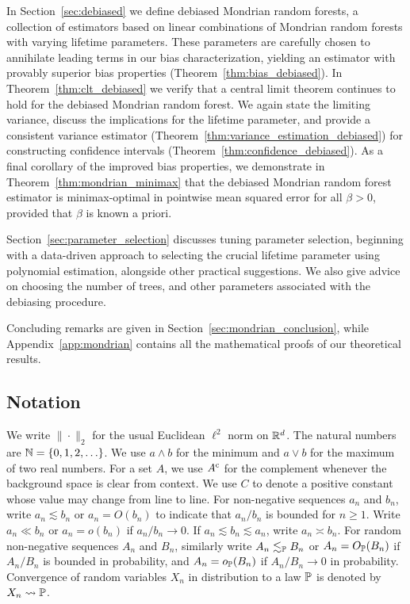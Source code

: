 In Section~\ref{sec:debiased} we define debiased Mondrian random forests,
a collection of estimators
based on linear combinations of Mondrian random forests
with varying lifetime parameters.
These parameters are carefully chosen to annihilate leading terms
in our bias characterization,
yielding an estimator with provably superior bias properties
(Theorem~\ref{thm:bias_debiased}).
In Theorem~\ref{thm:clt_debiased} we verify that a central limit theorem
continues to hold for the debiased Mondrian random forest.
We again state the limiting variance,
discuss the implications for the lifetime parameter, and provide
a consistent variance estimator
(Theorem~\ref{thm:variance_estimation_debiased})
for constructing confidence intervals
(Theorem~\ref{thm:confidence_debiased}).
As a final corollary of the improved bias properties,
we demonstrate in Theorem~\ref{thm:mondrian_minimax} that the debiased Mondrian
random forest estimator is minimax-optimal in pointwise mean squared error
for all $\beta > 0$, provided that $\beta$ is known a priori.

Section~\ref{sec:parameter_selection} discusses tuning
parameter selection, beginning with a data-driven approach to
selecting the crucial lifetime parameter using polynomial estimation,
alongside other practical suggestions.
We also give advice on choosing the number of trees,
and other parameters associated with the debiasing procedure.

Concluding remarks are given in Section~\ref{sec:mondrian_conclusion},
while Appendix~\ref{app:mondrian} contains all the mathematical
proofs of our theoretical results.

\subsection{Notation}

We write $\|\cdot\|_2$ for the usual Euclidean $\ell^2$ norm on $\R^d$.
The natural numbers are $\N = \{0, 1, 2, \ldots \}$.
We use $a \wedge b$ for the minimum and $a \vee b$ for the maximum
of two real numbers.
For a set $A$, we use $A^\c$ for the complement
whenever the background space is clear from context.
We use $C$ to denote a positive constant whose value may change
from line to line.
For non-negative sequences
$a_n$ and $b_n$, write
$a_n \lesssim b_n$ or $a_n = O(b_n)$
to indicate that
$a_n / b_n$ is bounded for $n\geq 1$.
Write $a_n \ll b_n$ or $a_n = o(b_n)$ if $a_n / b_n \to 0$.
If $a_n \lesssim b_n \lesssim a_n$,
write $a_n \asymp b_n$.
For random non-negative sequences
$A_n$ and $B_n$, similarly write
$A_n \lesssim_\P B_n$ or $A_n = O_\P(B_n)$ if
$A_n / B_n$ is bounded in probability,
and $A_n = o_\P(B_n)$ if $A_n / B_n \to 0$ in probability.
Convergence of random variables $X_n$ in distribution to a law $\P$
is denoted by $X_n \rightsquigarrow \P$.

